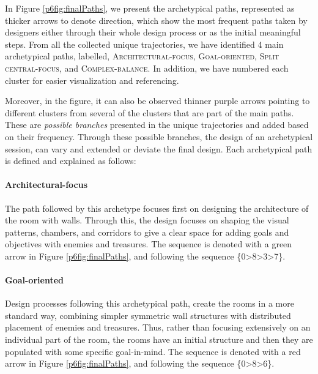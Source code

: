 In Figure \ref{p6fig:finalPaths}, we present the archetypical paths, represented as thicker arrows to denote direction, which show the most frequent paths taken by designers either through their whole design process or as the initial meaningful steps. From all the collected unique trajectories, we have identified 4 main archetypical paths, labelled, \textsc{Architectural-focus}, \textsc{Goal-oriented}, \textsc{Split central-focus}, and \textsc{Complex-balance}. In addition, we have numbered each cluster for easier visualization and referencing. 

Moreover, in the figure, it can also be observed thinner purple arrows pointing to different clusters from several of the clusters that are part of the main paths. These are \textit{possible branches} presented in the unique trajectories and added based on their frequency. Through these possible branches, the design of an archetypical session, can vary and extended or deviate the final design. Each archetypical path is defined and explained as follows: 

\paragraph{Architectural-focus}The path followed by this archetype focuses first on designing the architecture of the room with walls. Through this, the design focuses on shaping the visual patterns, chambers, and corridors to give a clear space for adding goals and objectives with enemies and treasures. The sequence is denoted with a green arrow in Figure \ref{p6fig:finalPaths}, and following the sequence \{0\textgreater8\textgreater3\textgreater7\}.

\paragraph{Goal-oriented}Design processes following this archetypical path, create the rooms in a more standard way, combining simpler symmetric wall structures with distributed placement of enemies and treasures. Thus, rather than focusing extensively on an individual part of the room, the rooms have an initial structure and then they are populated with some specific goal-in-mind. The sequence is denoted with a red arrow in Figure \ref{p6fig:finalPaths}, and following the sequence \{0\textgreater8\textgreater6\}.


